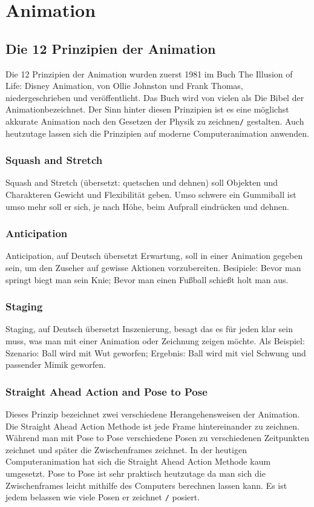 \section{Animation}
\subsection{Die 12 Prinzipien der Animation}
\label{animation:principles}
Die 12 Prinzipien der Animation wurden zuerst 1981 im Buch \dq The Illusion of Life: Disney Animation\dq, von Ollie Johnston und Frank Thomas,
niedergeschrieben und veröffentlicht. Das Buch wird von vielen als \dq Die Bibel der Animation\dq bezeichnet. Der Sinn hinter diesen Prinzipien ist es eine möglichst
akkurate Animation nach den Gesetzen der Physik zu zeichnen\verb-/- gestalten. Auch heutzutage lassen sich die Prinzipien auf moderne Computeranimation anwenden.

\subsubsection{Squash and Stretch}
Squash and Stretch (übersetzt: quetschen und dehnen) soll Objekten und Charakteren Gewicht und Flexibilität geben.
 Umso schwere ein Gummiball ist umso mehr soll er sich, je nach Höhe, beim Aufprall eindrücken und dehnen.

\subsubsection{Anticipation}
Anticipation, auf Deutsch übersetzt \dq Erwartung\dq, soll in einer Animation gegeben sein, um den Zuseher auf gewisse Aktionen vorzubereiten.
Besipiele: Bevor man springt biegt man sein Knie; Bevor man einen Fußball schießt holt man aus.

\subsubsection{Staging}
Staging, auf Deutsch übersetzt \dq Inszenierung\dq, besagt das es für jeden klar sein muss, was man mit einer Animation oder Zeichnung zeigen möchte.
Als Beispiel: Szenario: Ball wird mit Wut geworfen; Ergebnis: Ball wird mit viel Schwung und passender Mimik geworfen.

\subsubsection{Straight Ahead Action and Pose to Pose}
Dieses Prinzip bezeichnet zwei verschiedene Herangehensweisen der Animation. Die Straight Ahead Action Methode ist jede Frame hintereinander zu zeichnen.
Während man mit Pose to Pose verschiedene Posen zu verschiedenen Zeitpunkten zeichnet und später die Zwischenframes zeichnet.
In der heutigen Computeranimation hat sich die Straight Ahead Action Methode kaum umgesetzt.
Pose to Pose ist sehr praktisch heutzutage da man sich die Zwischenframes leicht mithilfe des Computers berechnen lassen kann. Es ist jedem belassen wie viele Posen er zeichnet \verb-/- posiert.

